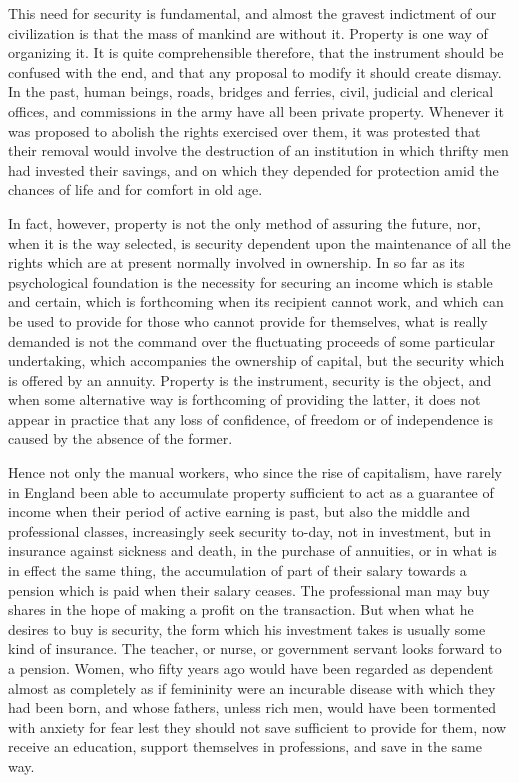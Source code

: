\documentclass{book}
\begin{document}
This need for security is fundamental, and almost the gravest indictment of our civilization is that the mass of mankind are without it. Property is one way of organizing it. It is quite comprehensible therefore, that the instrument should be confused with the end, and that any proposal to modify it should create dismay. In the past, human beings, roads, bridges and ferries, civil, judicial and clerical offices, and commissions in the army have all been private property. Whenever it was proposed to abolish the rights exercised over them, it was protested that their removal would involve the destruction of an institution in which thrifty men had invested their savings, and on which they depended for protection amid the chances of life and for comfort in old age.

In fact, however, property is not the only method of assuring the future, nor, when it is the way selected, is security dependent upon the maintenance of all the rights which are at present normally involved in ownership. In so far as its psychological foundation is the necessity for securing an income which is stable and certain, which is forthcoming when its recipient cannot work, and which can be used to provide for those who cannot provide for themselves, what is really demanded is not the command over the fluctuating proceeds of some particular undertaking, which accompanies the ownership of capital, but the security which is offered by an annuity. Property is the instrument, security is the object, and when some alternative way is forthcoming of providing the latter, it does not appear in practice that any loss of confidence, of freedom or of independence is caused by the absence of the former.

Hence not only the manual workers, who since the rise of capitalism, have rarely in England been able to accumulate property sufficient to act as a guarantee of income when their period of active earning is past, but also the middle and professional classes, increasingly seek security to-day, not in investment, but in insurance against sickness and death, in the purchase of annuities, or in what is in effect the same thing, the accumulation of part of their salary towards a pension which is paid when their salary ceases. The professional man may buy shares in the hope of making a profit on the transaction. But when what he desires to buy is security, the form which his investment takes is usually some kind of insurance. The teacher, or nurse, or government servant looks forward to a pension. Women, who fifty years ago would have been regarded as dependent almost as completely as if femininity were an incurable disease with which they had been born, and whose fathers, unless rich men, would have been tormented with anxiety for fear lest they should not save sufficient to provide for them, now receive an education, support themselves in professions, and save in the same way.
\end{document}
